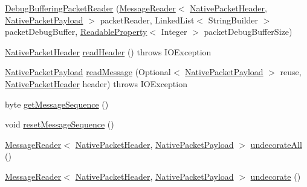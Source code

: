 \begin{DoxyCompactItemize}
\item 
\mbox{\hyperlink{classcom_1_1mysql_1_1cj_1_1protocol_1_1a_1_1_debug_buffering_packet_reader_a9060c97fdff3924c3e5bd97bbea114c7}{Debug\+Buffering\+Packet\+Reader}} (\mbox{\hyperlink{interfacecom_1_1mysql_1_1cj_1_1protocol_1_1_message_reader}{Message\+Reader}}$<$ \mbox{\hyperlink{classcom_1_1mysql_1_1cj_1_1protocol_1_1a_1_1_native_packet_header}{Native\+Packet\+Header}}, \mbox{\hyperlink{classcom_1_1mysql_1_1cj_1_1protocol_1_1a_1_1_native_packet_payload}{Native\+Packet\+Payload}} $>$ packet\+Reader, Linked\+List$<$ String\+Builder $>$ packet\+Debug\+Buffer, \mbox{\hyperlink{interfacecom_1_1mysql_1_1cj_1_1conf_1_1_readable_property}{Readable\+Property}}$<$ Integer $>$ packet\+Debug\+Buffer\+Size)
\item 
\mbox{\hyperlink{classcom_1_1mysql_1_1cj_1_1protocol_1_1a_1_1_native_packet_header}{Native\+Packet\+Header}} \mbox{\hyperlink{classcom_1_1mysql_1_1cj_1_1protocol_1_1a_1_1_debug_buffering_packet_reader_a59ead81a6bb0f0b358f9e44db6b63280}{read\+Header}} ()  throws I\+O\+Exception 
\item 
\mbox{\hyperlink{classcom_1_1mysql_1_1cj_1_1protocol_1_1a_1_1_native_packet_payload}{Native\+Packet\+Payload}} \mbox{\hyperlink{classcom_1_1mysql_1_1cj_1_1protocol_1_1a_1_1_debug_buffering_packet_reader_a50c66cbcfdd3b08a8135f3b6eb91cd19}{read\+Message}} (Optional$<$ \mbox{\hyperlink{classcom_1_1mysql_1_1cj_1_1protocol_1_1a_1_1_native_packet_payload}{Native\+Packet\+Payload}} $>$ reuse, \mbox{\hyperlink{classcom_1_1mysql_1_1cj_1_1protocol_1_1a_1_1_native_packet_header}{Native\+Packet\+Header}} header)  throws I\+O\+Exception 
\item 
byte \mbox{\hyperlink{classcom_1_1mysql_1_1cj_1_1protocol_1_1a_1_1_debug_buffering_packet_reader_a221efd81777e2a3fcceb0368f6baf0db}{get\+Message\+Sequence}} ()
\item 
void \mbox{\hyperlink{classcom_1_1mysql_1_1cj_1_1protocol_1_1a_1_1_debug_buffering_packet_reader_a6739a6433fdce69bb684e15048481dc2}{reset\+Message\+Sequence}} ()
\item 
\mbox{\hyperlink{interfacecom_1_1mysql_1_1cj_1_1protocol_1_1_message_reader}{Message\+Reader}}$<$ \mbox{\hyperlink{classcom_1_1mysql_1_1cj_1_1protocol_1_1a_1_1_native_packet_header}{Native\+Packet\+Header}}, \mbox{\hyperlink{classcom_1_1mysql_1_1cj_1_1protocol_1_1a_1_1_native_packet_payload}{Native\+Packet\+Payload}} $>$ \mbox{\hyperlink{classcom_1_1mysql_1_1cj_1_1protocol_1_1a_1_1_debug_buffering_packet_reader_ae6337b7785d1c8adb1b4784387c2f959}{undecorate\+All}} ()
\item 
\mbox{\hyperlink{interfacecom_1_1mysql_1_1cj_1_1protocol_1_1_message_reader}{Message\+Reader}}$<$ \mbox{\hyperlink{classcom_1_1mysql_1_1cj_1_1protocol_1_1a_1_1_native_packet_header}{Native\+Packet\+Header}}, \mbox{\hyperlink{classcom_1_1mysql_1_1cj_1_1protocol_1_1a_1_1_native_packet_payload}{Native\+Packet\+Payload}} $>$ \mbox{\hyperlink{classcom_1_1mysql_1_1cj_1_1protocol_1_1a_1_1_debug_buffering_packet_reader_a9e51a1437df97c27971470ee4df5ab83}{undecorate}} ()
\end{DoxyCompactItemize}


